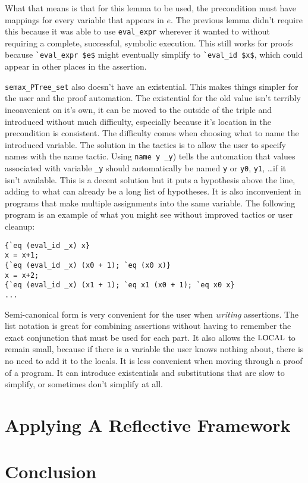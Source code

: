 \documentclass{puthesis}
\begin{document}
What that means is that for this lemma to be used, the precondition must
have mappings for every variable that appears in $e$. The previous 
lemma didn't require this because it was able to use \lstinline|eval_expr|
wherever it wanted to without requiring a complete, successful, symbolic
execution. This still works for proofs because \lstinline|`eval_expr $e$|
might eventually simplify to \lstinline|`eval_id $x$|, which could appear
in other places in the assertion. 

\lstinline|semax_PTree_set| also doesn't have an existential. This
makes things simpler for the user and the proof automation. The existential
for the old value isn't terribly inconvenient on it's own, it can be 
moved to the outside of the triple and introduced without much difficulty,
especially because it's location in the precondition is consistent. The
difficulty comes when choosing what to name the introduced variable. The
solution in the tactics is to allow the user to specify names with the name
tactic. Using \lstinline|name y _y|) tells the automation that values
associated with variable \lstinline|_y| should automatically be named
\lstinline|y| or \lstinline|y0|, \lstinline|y1|, \ldots if it isn't available.
This is a decent solution but it puts a hypothesis above the line, adding
to what can already be a long list of hypotheses. It is also inconvenient
in programs that make multiple assignments into the same variable. The
following program is an example of what you might see without improved
tactics or user cleanup: 

\begin{lstlisting}
{`eq (eval_id _x) x}
x = x+1;
{`eq (eval_id _x) (x0 + 1); `eq (x0 x)}
x = x+2;
{`eq (eval_id _x) (x1 + 1); `eq x1 (x0 + 1); `eq x0 x}
...
\end{lstlisting}



Semi-canonical form is very convenient for the user when \emph{writing}
assertions. The list notation is great for combining 
assertions without having to remember the exact conjunction that
must be used for each part. It also allows the $\mbox{\small LOCAL}$ to remain
small, because if there is a variable the user knows nothing
about, there is no need to add it to the locals. It is less convenient
when moving through a proof of a program. It can introduce
existentials and substitutions that are slow to simplify, or sometimes
don't simplify at all. 




\chapter{Applying A Reflective Framework}

\chapter{Conclusion}



\end{document}

